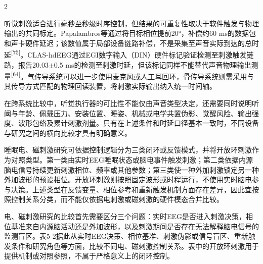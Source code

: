 \documentclass[UTF8,zihao=5,fontset=none]{ctexart}
\newcommand{\hei}{\CJKfamily{hei}}
\newcommand{\leveltwo}[1]{%
  \par\noindent{\hei\fontsize{10.5pt}{15.6pt}\selectfont\bfseries #1\par}}
\newcommand{\refcite}[1]{\nolinebreak[4]\textsuperscript{[#1]}}
\begin{document}
\begin{multicols}{2}

听觉刺激适合进行毫秒至秒级时序控制，但结果的可重复性取决于软件触发与物理输出的共同标定。Papalambros等通过将目标相位提前20°，补偿约60 ms的数据包和声卡硬件延迟；该数值属于局部设备链路补偿，不是采集至声音实际到达的总时延\refcite{75}。CLAS-hdEEG通过EGI数字输入（DIN）硬件标记验证检测至刺激触发链路，报告20.03$\pm$0.5 ms的检测至刺激时延，但该标记同样不能替代声音物理输出测量\refcite{64}。气传导系统可以进一步使用麦克风或人工耳回环，骨传导系统则需采用与其传导方式匹配的物理回读装置，将刺激实际输出纳入统一时间轴。\par

在跨系统比较中，听觉执行器的可比性不能仅由声音类型决定，还需要同时说明听阈与年龄、佩戴压力、安装位置、睡姿、机械或电学共置伪影、觉醒风险、输出强度、波形包络及累计刺激剂量。只有在上述条件和时延口径基本一致时，不同设备与研究之间的横向比较才具有明确意义。\par

\leveltwo{5.2 电刺激与磁刺激}

睡眠电、磁刺激研究可依据控制逻辑分为三类闭环或反馈模式，并将开放环刺激作为对照类型。第一类由实时EEG睡眠状态或脑电事件触发刺激；第二类依据内源脑电信号持续更新刺激相位、频率或其他参数；第三类使一种外加刺激锁定另一种外加波形的预设相位。开放环刺激则按照固定波形或时程运行，不使用实时脑电参与决策。上述类型在反馈变量、相位参考和重新触发机制方面存在差异，因此宜按照控制关系分类，而不能仅依据电刺激或磁刺激的硬件模态合并比较。\par

电、磁刺激研究的比较首先需要区分三个问题：实时EEG是否进入刺激决策，相位基准来自内源脑活动还是外加波形，以及刺激期间是否存在无法解释脑电信号的监测盲区。表5-2据此从实时EEG决策、相位基准、刺激伪影或信号盲区、重新触发条件和研究角色等方面，比较不同电、磁刺激控制关系。表中的开放环刺激用于提供机制或对照参照，不属于严格意义上的闭环控制。\par

\end{multicols}
\end{document}

